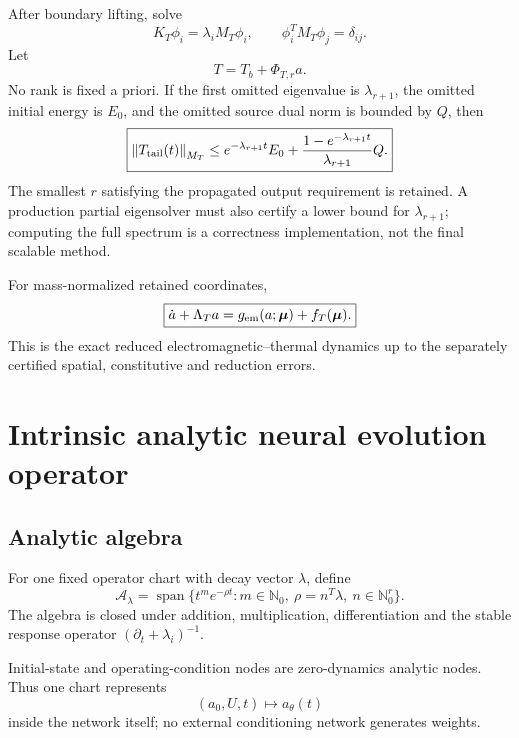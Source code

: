 \documentclass[11pt]{article}
\theoremstyle{remark}
\newcommand{\mupar}{\boldsymbol\mu}
\newcommand{\norm}[1]{\left\lVert #1\right\rVert}
\begin{document}
After boundary lifting, solve
\begin{equation}
K_T\phi_i=\lambda_iM_T\phi_i,
\qquad
\phi_i^TM_T\phi_j=\delta_{ij}.
\label{eq:thermal_eig}
\end{equation}
Let
\[
T=T_b+\Phi_{T,r}a.
\]
No rank is fixed a priori. If the first omitted eigenvalue is \(\lambda_{r+1}\), the omitted initial energy is \(E_0\), and the omitted source dual norm is bounded by \(Q\), then
\begin{equation}
\boxed{
\norm{T_{\rm tail}(t)}_{M_T}
\le e^{-\lambda_{r+1}t}E_0
+\frac{1-e^{-\lambda_{r+1}t}}{\lambda_{r+1}}Q.
}
\label{eq:thermal_tail}
\end{equation}
The smallest \(r\) satisfying the propagated output requirement is retained. A production partial eigensolver must also certify a lower bound for \(\lambda_{r+1}\); computing the full spectrum is a correctness implementation, not the final scalable method.

For mass-normalized retained coordinates,
\begin{equation}
\boxed{
\dot a+\Lambda_Ta=g_{\rm em}(a;\mupar)+f_T(\mupar).
}
\label{eq:closed_reduced}
\end{equation}
This is the exact reduced electromagnetic--thermal dynamics up to the separately certified spatial, constitutive and reduction errors.

\section{Intrinsic analytic neural evolution operator}

\subsection{Analytic algebra}
For one fixed operator chart with decay vector \(\lambda\), define
\[
\mathscr A_\lambda
=\operatorname{span}\{t^me^{-\rho t}:m\in\mathbb N_0,\ \rho=n^T\lambda,\ n\in\mathbb N_0^r\}.
\]
The algebra is closed under addition, multiplication, differentiation and the stable response operator \((\partial_t+\lambda_i)^{-1}\).

Initial-state and operating-condition nodes are zero-dynamics analytic nodes. Thus one chart represents
\begin{equation}
\boxed{
(a_0,U,t)\mapsto a_\theta(t)
}
\label{eq:parametric_analytic_map}
\end{equation}
inside the network itself; no external conditioning network generates weights.
\end{document}
